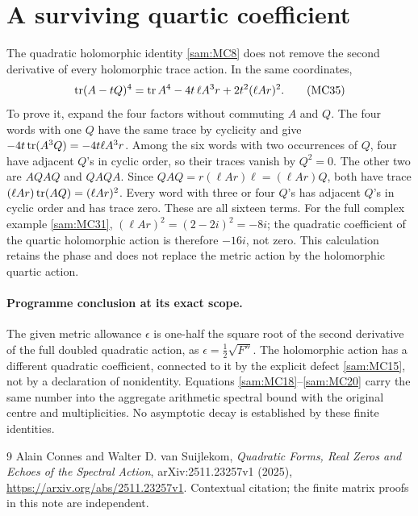 \section{A surviving quartic coefficient}

The quadratic holomorphic identity \eqref{sam:MC8} does not remove the second
derivative of every holomorphic trace action. In the same coordinates,
\begin{equation}
 \operatorname{tr}(A-tQ)^4
   =\operatorname{tr} A^4-4t\,\ell A^3r+2t^2(\ell Ar)^2.
 \tag{MC35}\label{sam:MC35}
\end{equation}
To prove it, expand the four factors without commuting \(A\) and \(Q\).
The four words with one \(Q\) have the same trace by cyclicity and give
\(-4t\operatorname{tr}(A^3Q)=-4t\ell A^3r\).
Among the six words with two occurrences of \(Q\), four have adjacent
\(Q\)'s in cyclic order, so their traces vanish by \(Q^2=0\).
The other two are \(AQAQ\) and \(QAQA\). Since
\(QAQ=r(\ell Ar)\ell=(\ell Ar)Q\), both have trace
\((\ell Ar)\operatorname{tr}(AQ)=(\ell Ar)^2\).
Every word with three or four \(Q\)'s has adjacent \(Q\)'s in cyclic
order and has trace zero. These are all sixteen terms.
For the full complex example \eqref{sam:MC31},
\((\ell Ar)^2=(2-2i)^2=-8i\); the quadratic coefficient of the
quartic holomorphic action is therefore \(-16i\), not zero.
This calculation retains the phase and does not replace the metric
action by the holomorphic quartic action.

\paragraph{Programme conclusion at its exact scope.}
The given metric allowance \(\epsilon\) is one-half the square root of
the second derivative of the full doubled quadratic action, as
\(\epsilon=\tfrac12\sqrt{F''}\). The holomorphic action has a different
quadratic coefficient, connected to it by the explicit defect
\eqref{sam:MC15}, not by a declaration of nonidentity. Equations
\eqref{sam:MC18}--\eqref{sam:MC20} carry the same number into the aggregate
arithmetic spectral bound with the original centre and multiplicities.
No asymptotic decay is established by these finite identities.

\begin{thebibliography}{9}
Alain Connes and Walter D. van Suijlekom,
\emph{Quadratic Forms, Real Zeros and Echoes of the Spectral Action},
arXiv:2511.23257v1 (2025),
\url{https://arxiv.org/abs/2511.23257v1}.
Contextual citation; the finite matrix proofs in this note are independent.
\end{thebibliography}

